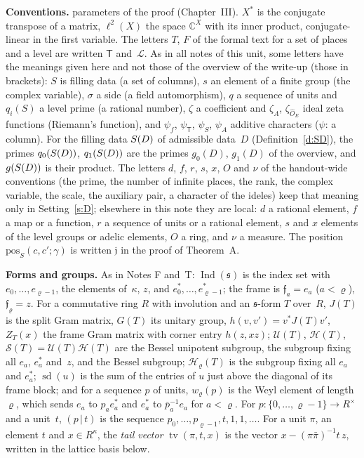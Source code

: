 \documentclass[11pt,a4paper]{article}
\newcommand{\m}[1]{\mbox{$#1$}}        %
\newcommand{\subhead}[1]{\par\addvspace{9pt plus 2pt}\Needspace{4\baselineskip}\noindent\textbf{#1}\enspace\ignorespaces}
\theoremstyle{plainx}
\theoremstyle{uprightx}
\newenvironment{conventions}{\par\addvspace{5pt}\noindent\textbf{Conventions.}\enspace\ignorespaces}{\par\addvspace{3pt}}
\newcommand{\fs}{\mathfrak{s}}                      %
\newcommand{\sT}{\mathsf{T}}                        %
\newcommand{\cL}{\mathcal{L}}                       %
\newcommand{\hO}{\hat{O}_E}
\newcommand{\Ix}[1]{\operatorname{Ind}(#1)}                          %
\newcommand{\qS}[2]{q_{#2}(#1)}                     %
\newcommand{\gS}[1]{g(#1)}                          %
\newcommand{\pos}[4]{\mathrm{pos}_{#1}(#2,#3;#4)}   %
\newcommand{\JT}[1]{J(#1)}                          %
\newcommand{\GT}[1]{G(#1)}                          %
\newcommand{\UT}[1]{\mathcal{U}(#1)}                %
\newcommand{\HT}[1]{\mathcal{H}(#1)}                %
\newcommand{\ST}[1]{\mathcal{S}(#1)}                %
\newcommand{\Hl}[2]{\mathcal{H}_{#1}(#2)}           %
\newcommand{\sd}[1]{\operatorname{sd}(#1)}          %
\newcommand{\ZT}[2]{Z_{#1}(#2)}                     %
\newcommand{\weyl}[2]{w_{#1}(#2)}                   %
\newcommand{\pad}[2]{(#1\,|\,#2)}                   %
\newcommand{\tailv}[3]{\operatorname{tv}(#1,#2,#3)} %
\newcommand{\psiT}[1]{\psi_{#1}}                    %
\newcommand{\psiS}[1]{\psi_{#1}}                     %
\newcommand{\CC}{\mathbb{C}}
\begin{document}
\begin{conventions}
parameters of the proof (Chapter~III). $X^*$ is the conjugate transpose of a matrix, \m{\ell^2(X)} the space
\m{\CC^X} with its inner product, conjugate-linear in the first variable. The letters $T$, $F$ of the formal
text for a set of places and a level are written $\sT$ and~$\cL$. As in all notes of this unit, some letters have
the meanings given here and not those of the overview of the write-up (those in brackets): $S$ is filling data
(a set of columns), $s$ an element of a finite group (the complex variable), $\sigma$ a side (a field
automorphism), $q$ a sequence of units and \m{\qS{S}{i}} a level prime (a rational number), $\zeta$ a coefficient
and \m{\zeta_A}, \m{\zeta_{\hO}} ideal zeta functions (Riemann's function), and $\psi_f$, \m{\psiT{\sT}}, \m{\psiS{S}},
$\psi_A$ additive characters ($\psi$: a column). For the filling data \m{\SD{D}} of admissible data~$D$
(Definition~\ref{d:SD}), the primes \m{\qS{\SD{D}}{0}}, \m{\qS{\SD{D}}{1}} are the primes \m{g_0(D)}, \m{g_1(D)} of
the overview, and \m{\gS{\SD{D}}} is their product. The letters $d$, $f$, $r$, $s$, $x$, $O$ and $\nu$ of the handout-wide conventions
(the prime, the number of infinite places, the rank, the complex variable, the scale, the auxiliary pair, a character of the
ideles) keep that meaning only in Setting~\ref{s:D}; elsewhere in this note they are local: $d$ a rational element, $f$ a map
or a function, $r$ a sequence of units or a rational element, $s$ and $x$ elements of the level groups or adelic elements,
$O$ a ring, and $\nu$ a measure. The position \m{\pos{S}{c}{c'}{\gamma}} is written $\mathfrak j$ in the proof of Theorem~A.
\end{conventions}

\subhead{Forms and groups.} As in Notes F and~T: \m{\Ix{\fs}} is the index set with \m{e_0,\dots,e_{\varrho-1}},
the elements of~$\kappa$, $z$, and \m{e^*_0,\dots,e^*_{\varrho-1}}; the frame is \m{\mathfrak f_a=e_a}
(\m{a<\varrho}), \m{\mathfrak f_\varrho=z}. For a commutative ring $R$ with involution and an $\fs$-form $T$
over~$R$, \m{\JT{T}} is the split Gram matrix, \m{\GT{T}} its unitary group, \m{h(v,v')=v^*\JT{T}v'},
\m{\ZT{T}{x}} the frame Gram matrix with corner entry \m{h(z,xz)}; \m{\UT{T}}, \m{\HT{T}}, \m{\ST{T}=\UT{T}\HT{T}} are
the Bessel unipotent subgroup, the subgroup fixing all $e_a$, $e^*_a$ and~$z$, and the Bessel subgroup;
\m{\Hl{\varrho}{T}} is the subgroup fixing all $e_a$ and $e^*_a$; \m{\sd{u}} is the sum of the entries of $u$ just
above the diagonal of its frame block; and for a sequence $p$ of units, \m{\weyl{\varrho}{p}} is the Weyl element
of length~$\varrho$, which sends $e_a$ to \m{p_ae^*_a} and $e^*_a$ to \m{\bar p_a^{-1}e_a} for \m{a<\varrho}. For
\m{p\colon\{0,\dots,\varrho-1\}\to R^{\times}} and a unit~$t$, \m{\pad{p}{t}} is the sequence
\m{p_0,\dots,p_{\varrho-1},t,1,1,\dots}. For a unit $\pi$, an element $t$ and \m{x\in R^{\kappa}}, the \emph{tail
vector} \m{\tailv{\pi}{t}{x}} is the vector \m{x-(\pi\bar\pi)^{-1}t\,z}, written in the lattice basis below.
\end{document}

